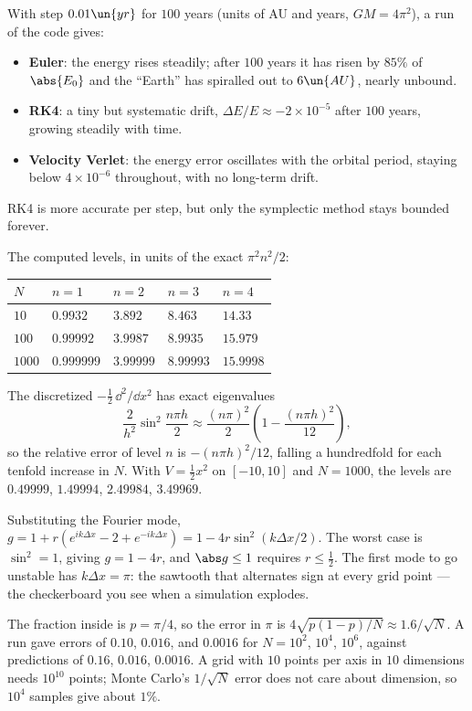  With step $0.01\un{yr}$ for $100$ years (units of AU and years, $GM = 4\pi^2$), a run of the code gives:
\begin{itemize}[itemsep=2pt]
  \item \textbf{Euler}: the energy rises steadily; after $100$ years it has risen by $85\%$ of $\abs{E_0}$ and the ``Earth'' has spiralled out to $6\un{AU}$, nearly unbound.
  \item \textbf{RK4}: a tiny but systematic drift, $\Delta E/E\approx-2\times10^{-5}$ after $100$ years, growing steadily with time.
  \item \textbf{Velocity Verlet}: the energy error oscillates with the orbital period, staying below $4\times10^{-6}$ throughout, with no long-term drift.
\end{itemize}
RK4 is more accurate per step, but only the symplectic method stays bounded forever.

 The computed levels, in units of the exact $\pi^2n^2/2$:
\begin{center}
\small
\begin{tabular}{@{}lllll@{}}
\toprule
$N$ & $n=1$ & $n=2$ & $n=3$ & $n=4$\\
\midrule
$10$ & $0.9932$ & $3.892$ & $8.463$ & $14.33$\\
$100$ & $0.99992$ & $3.9987$ & $8.9935$ & $15.979$\\
$1000$ & $0.999999$ & $3.99999$ & $8.99993$ & $15.9998$\\
\bottomrule
\end{tabular}
\end{center}
The discretized $-\tfrac12\,\dd^2/\dd x^2$ has exact eigenvalues
\[
  \frac{2}{h^2}\sin^2\frac{n\pi h}{2}\approx\frac{(n\pi)^2}{2}\left(1 - \frac{(n\pi h)^2}{12}\right),
\]
so the relative error of level $n$ is $-(n\pi h)^2/12$, falling a hundredfold for each tenfold increase in $N$. With $V = \tfrac12x^2$ on $[-10,10]$ and $N = 1000$, the levels are $0.49999$, $1.49994$, $2.49984$, $3.49969$.

 Substituting the Fourier mode, $g = 1 + r(e^{ik\Delta x} - 2 + e^{-ik\Delta x}) = 1 - 4r\sin^2(k\Delta x/2)$. The worst case is $\sin^2 = 1$, giving $g = 1-4r$, and $\abs g\le1$ requires $r\le\tfrac12$. The first mode to go unstable has $k\Delta x = \pi$: the sawtooth that alternates sign at every grid point --- the checkerboard you see when a simulation explodes.

 The fraction inside is $p = \pi/4$, so the error in $\pi$ is $4\sqrt{p(1-p)/N}\approx1.6/\sqrt N$. A run gave errors of $0.10$, $0.016$, and $0.0016$ for $N = 10^2$, $10^4$, $10^6$, against predictions of $0.16$, $0.016$, $0.0016$. A grid with $10$ points per axis in $10$ dimensions needs $10^{10}$ points; Monte Carlo's $1/\sqrt N$ error does not care about dimension, so $10^4$ samples give about $1\%$.

